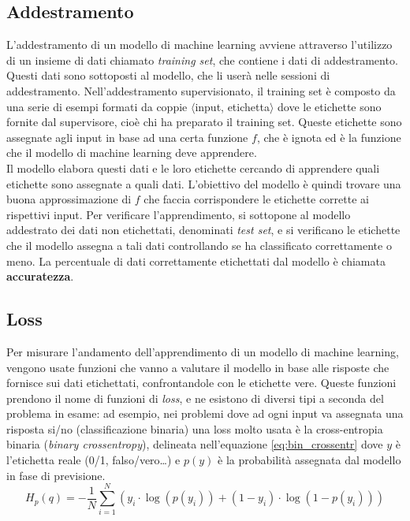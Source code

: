 \subsection*{Addestramento} L'addestramento di un modello di machine learning avviene attraverso l'utilizzo di un insieme di dati chiamato \textit{training set}, che contiene i dati di addestramento. Questi dati sono sottoposti al modello, che li userà nelle sessioni di addestramento. Nell'addestramento supervisionato, il training set è composto da una serie di esempi formati da coppie $\langle$input, etichetta$\rangle$ dove le etichette sono fornite dal supervisore, cioè chi ha preparato il training set. Queste etichette sono assegnate agli input in base ad una certa funzione $f$, che è ignota ed è la funzione che il modello di machine learning deve apprendere.\\
Il modello elabora questi dati e le loro etichette cercando di apprendere quali etichette sono assegnate a quali dati. L'obiettivo del modello è quindi trovare una buona approssimazione di $f$ che faccia corrispondere le etichette corrette ai rispettivi input. Per verificare l'apprendimento, si sottopone al modello addestrato dei dati non etichettati, denominati \textit{test set}, e si verificano le etichette che il modello assegna a tali dati controllando se ha classificato correttamente o meno. La percentuale di dati correttamente etichettati dal modello è chiamata \textbf{accuratezza}.

\subsection*{Loss} Per misurare l'andamento dell'apprendimento di un modello di machine learning, vengono usate funzioni che vanno a valutare il modello in base alle risposte che fornisce sui dati etichettati, confrontandole con le etichette vere. Queste funzioni prendono il nome di funzioni di \textit{loss}, e ne esistono di diversi tipi a seconda del problema in esame: ad esempio, nei problemi dove ad ogni input va assegnata una risposta si/no (classificazione binaria) una loss molto usata è la cross-entropia binaria (\textit{binary crossentropy}), delineata nell'equazione \ref{eq:bin_crossentr} dove $y$ è l'etichetta reale (0/1, falso/vero\ldots) e $p(y)$ è la probabilità assegnata dal modello in fase di previsione.
\begin{equation}\label{eq:bin_crossentr}
H_p(q) = -\frac{1}{N}\sum_{i=1}^N \left(y_i\cdot\log(p(y_i)) + (1 - y_i)\cdot\log(1 - p(y_i))\right)
\end{equation}

